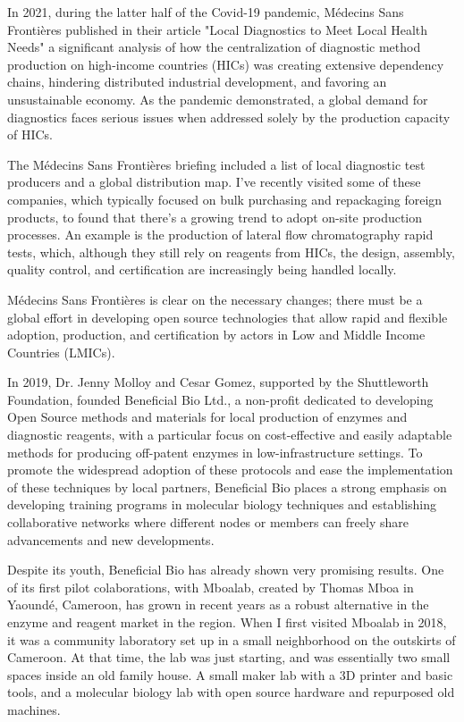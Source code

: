 In 2021, during the latter half of the Covid-19 pandemic, Médecins Sans Frontières published in their article "Local Diagnostics to Meet Local Health Needs"
a significant analysis of how the centralization of diagnostic method production on high-income countries (HICs) was creating extensive dependency chains, hindering distributed industrial development,
and favoring an unsustainable economy. As the pandemic demonstrated, a global demand for diagnostics faces serious issues when addressed solely
by the production capacity of HICs.

The Médecins Sans Frontières briefing included a list of local diagnostic test producers and a global distribution map. I've recently visited some of these companies, 
which typically focused on bulk purchasing and repackaging foreign products, to found that there's a growing trend to adopt on-site production processes. 
An example is the production of lateral flow chromatography rapid tests, which, although they still rely on reagents from HICs, the design, assembly, 
quality control, and certification are increasingly being handled locally.

Médecins Sans Frontières is clear on the necessary changes; there must be a global effort in developing open source technologies that allow rapid and flexible adoption, production, 
and certification by actors in Low and Middle Income Countries (LMICs).

In 2019, Dr. Jenny Molloy and Cesar Gomez, supported by the Shuttleworth Foundation, founded Beneficial Bio Ltd., a non-profit dedicated to developing Open Source 
methods and materials for local production of enzymes and diagnostic reagents, with a particular focus on cost-effective and easily adaptable methods for producing 
off-patent enzymes in low-infrastructure settings. To promote the widespread adoption of these protocols and ease the implementation of these techniques by local partners, 
Beneficial Bio places a strong emphasis on developing training programs in molecular biology techniques and establishing collaborative networks where different nodes or 
members can freely share advancements and new developments.

Despite its youth, Beneficial Bio has already shown very promising results. One of its first pilot colaborations, with Mboalab, created by Thomas Mboa in Yaoundé, Cameroon, has grown in 
recent years as a robust alternative in the enzyme and reagent market in the region. When I first visited Mboalab in 2018, it was a community laboratory set up in a small
 neighborhood on the outskirts of Cameroon. At that time, the lab was just starting, and was essentially two small spaces inside an old family house. A small maker lab with 
 a 3D printer and basic tools, and a molecular biology lab with open source hardware and repurposed old machines.

